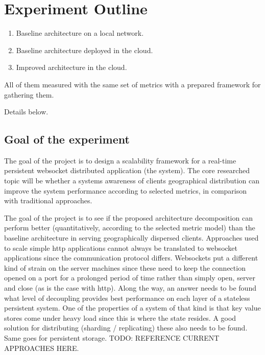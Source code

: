 \documentclass{uvamscse}
\begin{document}

\chapter{Experiment Outline}

\begin{enumerate}
  \item Baseline architecture on a local network.
  \item Baseline architecture deployed in the cloud.
  \item Improved architecture in the cloud.
\end{enumerate}

All of them measured with the same set of metrics with a prepared framework for gathering them.

Details below.

\section{Goal of the experiment}

The goal of the project is to design a scalability framework for a real-time persistent websocket distributed application (the system). The core researched topic will be whether a systems awareness of clients geographical distribution can improve the system performance according to selected metrics, in comparison with traditional approaches.

The goal of the project is to see if the proposed architecture decomposition can perform better (quantitatively, according to the selected metric model) than the baseline architecture in serving geographically dispersed clients. Approaches used to scale simple http applications cannot always be translated to websocket applications since the communication protocol differs. Websockets put a different kind of strain on the server machines since these need to keep the connection opened on a port for a prolonged period of time rather than simply open, server and close (as is the case with http). Along the way, an answer needs to be found what level of decoupling provides best performance on each layer of a stateless persistent system. One of the properties of a system of that kind is that key value stores come under heavy load since this is where the state resides. A good solution for distributing (sharding / replicating) these also needs to be found. Same goes for persistent storage.
TODO: REFERENCE CURRENT APPROACHES HERE.
\end{document}
